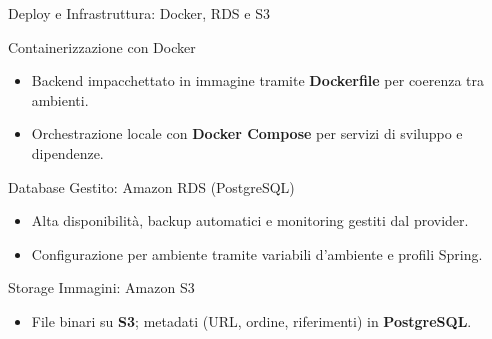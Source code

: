 \documentclass[10pt]{beamer}
\begin{document}
\begin{frame}{Deploy e Infrastruttura: Docker, RDS e S3}
    \begin{block}{Containerizzazione con Docker}
        \begin{itemize}
            \item Backend impacchettato in immagine tramite \textbf{Dockerfile} per coerenza tra ambienti.
            \item Orchestrazione locale con \textbf{Docker Compose} per servizi di sviluppo e dipendenze.
        \end{itemize}
    \end{block}
    \begin{block}{Database Gestito: Amazon RDS (PostgreSQL)}
        \begin{itemize}
            \item Alta disponibilità, backup automatici e monitoring gestiti dal provider.
            \item Configurazione per ambiente tramite variabili d'ambiente e profili Spring.
        \end{itemize}
    \end{block}
    \begin{block}{Storage Immagini: Amazon S3}
        \begin{itemize}
            \item File binari su \textbf{S3}; metadati (URL, ordine, riferimenti) in \textbf{PostgreSQL}.
        \end{itemize}
    \end{block}
\end{frame}
\end{document}
